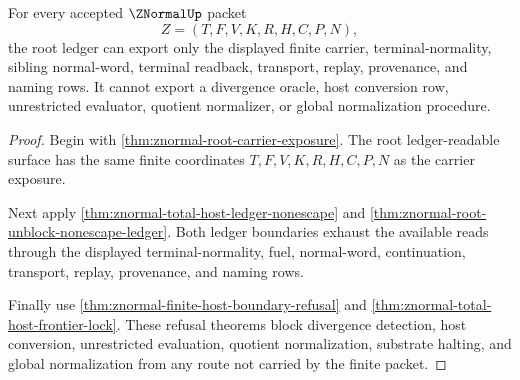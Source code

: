\begin{theorem}
\label{thm:znormal-root-ledger-nonescape}
For every accepted $\ZNormalUp$ packet
$$
Z=(T,F,V,K,R,H,C,P,N),
$$
the root ledger can export only the displayed finite carrier, terminal-normality, sibling normal-word, terminal readback, transport, replay, provenance, and naming rows. It cannot export a divergence oracle, host conversion row, unrestricted evaluator, quotient normalizer, or global normalization procedure.
\end{theorem}
\begin{proof}
Begin with \autoref{thm:znormal-root-carrier-exposure}. The root ledger-readable surface has the same finite coordinates $T,F,V,K,R,H,C,P,N$ as the carrier exposure.

Next apply \autoref{thm:znormal-total-host-ledger-nonescape} and \autoref{thm:znormal-root-unblock-nonescape-ledger}. Both ledger boundaries exhaust the available reads through the displayed terminal-normality, fuel, normal-word, continuation, transport, replay, provenance, and naming rows.

Finally use \autoref{thm:znormal-finite-host-boundary-refusal} and \autoref{thm:znormal-total-host-frontier-lock}. These refusal theorems block divergence detection, host conversion, unrestricted evaluation, quotient normalization, substrate halting, and global normalization from any route not carried by the finite packet.
\end{proof}

